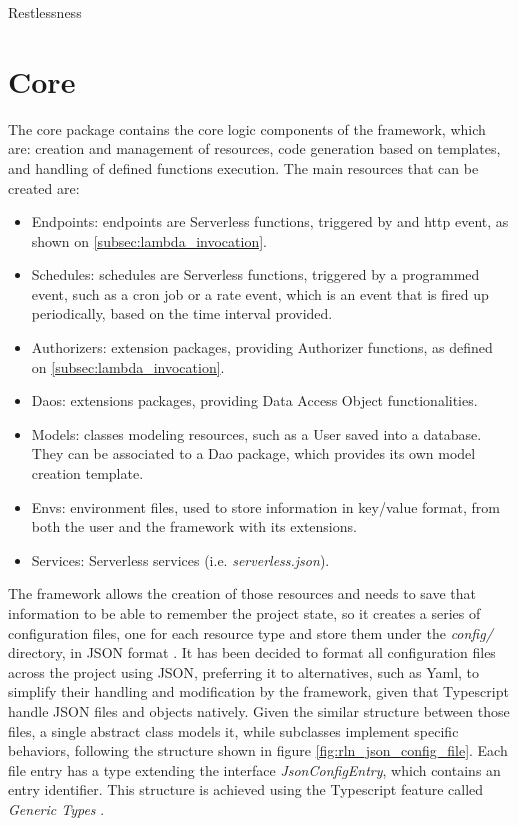 \begin{chapter}{Restlessness}
    \section{Core}
    The core package contains the core logic components of the framework, which
    are: creation and management of resources, code generation based on templates,
    and handling of defined functions execution.
    The main resources that can be created are:
    \begin{itemize}
        \item Endpoints: endpoints are Serverless functions, triggered by and http
            event, as shown on \ref{subsec:lambda_invocation}.
        \item Schedules: schedules are Serverless functions, triggered by a
            programmed event, such as a cron job or a rate event, which is an
            event that is fired up periodically, based on the time interval provided.
        \item Authorizers: extension packages, providing Authorizer functions, as
            defined on \ref{subsec:lambda_invocation}.
        \item Daos: extensions packages, providing Data Access Object functionalities.
        \item Models: classes modeling resources, such as a User saved into a database.
            They can be associated to a Dao package, which provides its own model
            creation template.
        \item Envs: environment files, used to store information in key/value format,
            from both the user and the framework with its extensions.
        \item Services: Serverless services (i.e. \textit{serverless.json}).
    \end{itemize}

    The framework allows the creation of those resources and needs to save that
    information to be able to remember the project state, so it creates a series
    of configuration files, one for each resource type and store them under the
    \textit{config/} directory, in JSON format \cite{json_iso}.
    It has been decided to format all configuration files across the project using JSON,
    preferring it to alternatives, such as Yaml, to simplify their handling and modification
    by the framework, given that Typescript handle JSON files and objects natively.
    Given the similar structure between those files, a single abstract class models
    it, while subclasses implement specific behaviors, following the structure
    shown in figure \ref{fig:rln_json_config_file}. Each file entry has a type
    extending the interface \mbox{\textit{JsonConfigEntry}}, which contains an entry
    identifier. This structure is achieved using the Typescript feature called
    \textit{Generic Types}
    \cite{ts_generics}.


\end{chapter}
